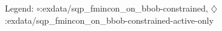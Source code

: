 Legend: {\color{NavyBlue}$\circ$}:exdata/sqp\_fmincon\_on\_bbob-constrained, {\color{Magenta}$\diamondsuit$}:exdata/sqp\_fmincon\_on\_bbob-constrained-active-only